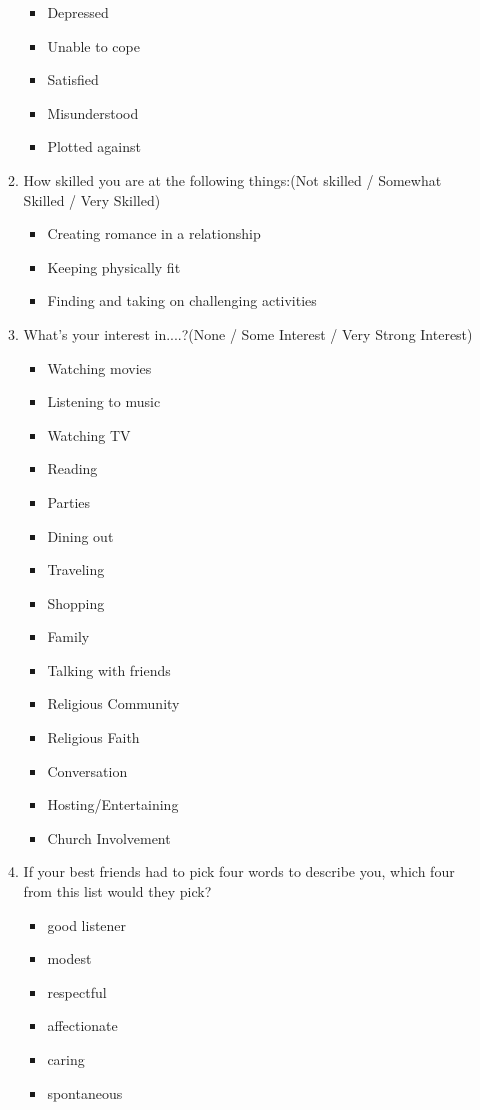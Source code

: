 \begin{appendices}
\begin{itemize}
\begin{enumerate}
\begin{itemize}
				\item Depressed
				\item Unable to cope
				\item Satisfied
				\item Misunderstood
				\item Plotted against			
			\end{itemize}
			\item How skilled you are at the following things:(Not skilled / Somewhat Skilled / Very Skilled)
			\begin{itemize}
				\item Creating romance in a relationship
				\item Keeping physically fit
				\item Finding and taking on challenging activities
			\end{itemize}
			\item What's your interest in....?(None / Some Interest / Very Strong Interest)
			\begin{itemize}
				\item Watching movies
				\item Listening to music
				\item Watching TV
				\item Reading
				\item Parties
				\item Dining out
				\item Traveling
				\item Shopping
				\item Family
				\item Talking with friends
				\item Religious Community
				\item Religious Faith
				\item Conversation
				\item Hosting/Entertaining
				\item Church Involvement
			\end{itemize}
			\item If your best friends had to pick four words to describe you, which four from this list would they pick?
			\begin{itemize}
				\item good listener 
				\item modest
				\item respectful
				\item affectionate
				\item caring
				\item spontaneous

\end{itemize}
\end{enumerate}
\end{itemize}
\end{appendices}
